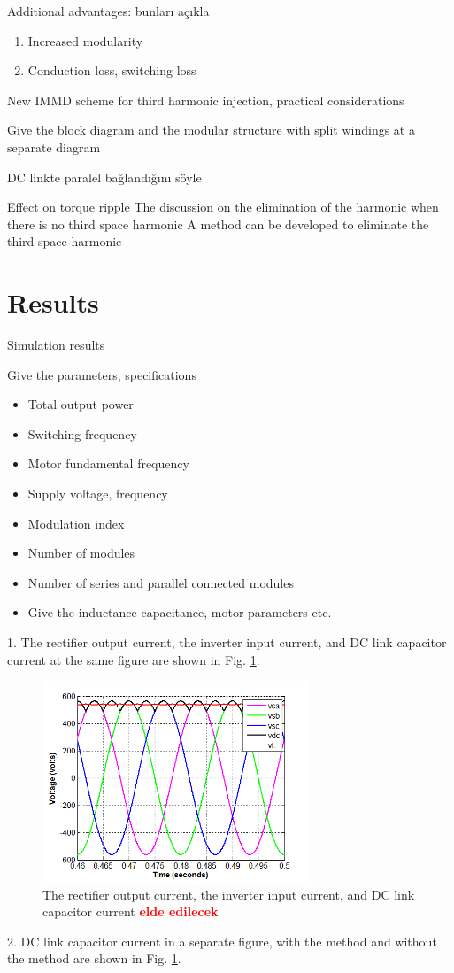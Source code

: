 \documentclass[conference,a4paper,twocolumn]{IEEEtran}
\begin{document}
Additional advantages: bunları açıkla
\begin{enumerate}
  \item Increased modularity
  \item Conduction loss, switching loss
\end{enumerate}

New IMMD scheme for third harmonic injection, practical considerations

Give the block diagram and the modular structure with split windings at a separate diagram

DC linkte paralel bağlandığını söyle

Effect on torque ripple
The discussion on the elimination of the harmonic when there is no third space harmonic
A method can be developed to eliminate the third space harmonic


\section{Results}
Simulation results

Give the parameters, specifications
\begin{itemize}
  \item Total output power
  \item Switching frequency
  \item Motor fundamental frequency
  \item Supply voltage, frequency
  \item Modulation index
  \item Number of modules
  \item Number of series and parallel connected modules
  \item Give the inductance capacitance, motor parameters etc.
\end{itemize}

1. The rectifier output current, the inverter input current, and DC link capacitor current at the same figure are shown in Fig. \ref{fig:sample}.
\begin{figure}[htp]
  \centering
  \includegraphics[width=8cm]{images/sample}
  \caption{The rectifier output current, the inverter input current, and DC link capacitor current  \textbf{\textcolor{red}{elde edilecek}}}
  \label{fig:sample}
\end{figure}
2. DC link capacitor current in a separate figure, with the method and without the method are shown in Fig. \ref{fig:sample}.
\end{document}

